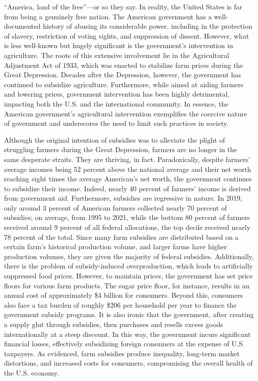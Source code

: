 \documentclass[12pt, a4paper, twoside]{article}
\begin{document}
\maketitle{}

“America, land of the free”—or so they say. In reality, the United States is far from being a genuinely free nation. The American government has a well-documented history of abusing its considerable power, including in the protection of slavery, restriction of voting rights, and suppression of dissent. However, what is less well-known but hugely significant is the government’s intervention in agriculture. The roots of this extensive involvement lie in the Agricultural Adjustment Act of 1933, which was enacted to stabilize farm prices during the Great Depression. Decades after the Depression, however, the government has continued to subsidize agriculture. Furthermore, while aimed at aiding farmers and lowering prices, government intervention has been highly detrimental, impacting both the U.S. and the international community. In essence, the American government’s agricultural intervention exemplifies the coercive nature of government and underscores the need to limit such practices in society.  

Although the original intention of subsidies was to alleviate the plight of struggling farmers during the Great Depression, farmers are no longer in the same desperate straits. They are thriving, in fact. Paradoxically, despite farmers’ average incomes being 52 percent above the national average and their net worth reaching eight times the average American’s net worth, the government continues to subsidize their income. Indeed, nearly 40 percent of farmers’ income is derived from government aid. Furthermore, subsidies are regressive in nature. In 2019, only around 3 percent of American farmers collected nearly 70 percent of subsidies; on average, from 1995 to 2021, while the bottom 80 percent of farmers received around 9 percent of all federal allocations, the top decile received nearly 78 percent of the total. Since many farm subsidies are distributed based on a certain farm’s historical production volume, and larger farms have higher production volumes, they are given the majority of federal subsidies. Additionally, there is the problem of subsidy-induced overproduction, which leads to artificially suppressed food prices. However, to maintain prices, the government has set price floors for various farm products. The sugar price floor, for instance, results in an annual cost of approximately \$4 billion for consumers. Beyond this, consumers also face a tax burden of roughly \$206 per household per year to finance the government subsidy programs. It is also ironic that the government, after creating a supply glut through subsidies, then purchases and resells excess goods internationally at a steep discount. In this way, the government incurs significant financial losses, effectively subsidizing foreign consumers at the expense of U.S. taxpayers. As evidenced, farm subsidies produce inequality, long-term market distortions, and increased costs for consumers, compromising the overall health of the U.S. economy. 
\end{document}

